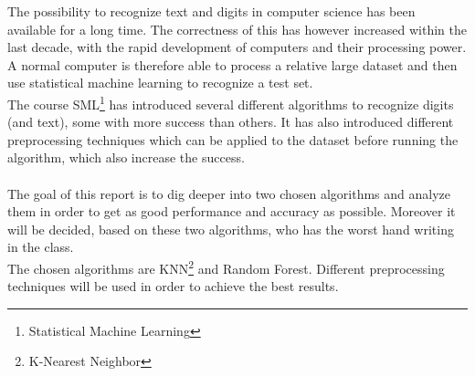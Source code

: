 \documentclass[report]{subfiles}
\begin{document}
The possibility to recognize text and digits in computer science has been available for a long time. The correctness of this has however increased within the last decade, with the rapid development of computers and their processing power. A normal computer is therefore able to process a relative large dataset and then use statistical machine learning to recognize a test set.\\
The course SML\footnote{Statistical Machine Learning} has introduced several different algorithms to recognize digits (and text), some with more success than others. It has also introduced different preprocessing techniques which can be applied to the dataset before running the algorithm, which also increase the success.\\\\
The goal of this report is to dig deeper into two chosen algorithms and analyze them in order to get as good performance and accuracy as possible. Moreover it will be decided, based on these two algorithms, who has the worst hand writing in the class.\\
The chosen algorithms are KNN\footnote{K-Nearest Neighbor} and Random Forest. Different preprocessing techniques will be used in order to achieve the best results.
\end{document}
